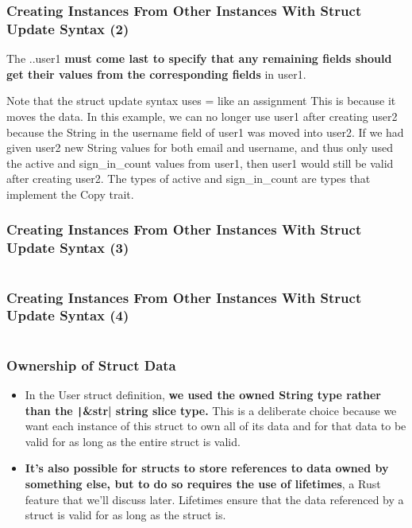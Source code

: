 \documentclass{beamer}
\begin{document}
\begin{frame}[fragile]
	\frametitle{Creating Instances From Other Instances With Struct Update Syntax (2)}
	The ..user1 \textbf{must come last to specify that any remaining fields should get their values from the corresponding fields} in user1.
	
	\begin{block}{Note that the struct update syntax uses = like an assignment}
		This is because it moves the data. In this example, we can no longer use user1 after creating user2 because the String in the username field of user1 was moved into user2. If we had given user2 new String values for both email and username, and thus only used the active and sign\_in\_count values from user1, then user1 would still be valid after creating user2. The types of active and sign\_in\_count are types that implement the Copy trait.
	\end{block}
	
\end{frame}


\begin{frame}[fragile]
	\frametitle{Creating Instances From Other Instances With Struct Update Syntax (3)}
	\inputminted{rust}{./code/struct-err.rs}
\end{frame}


\begin{frame}[fragile]
	\frametitle{Creating Instances From Other Instances With Struct Update Syntax (4)}
	\inputminted{shell}{./code/struct-err2.shell}
\end{frame}

\begin{frame}[fragile]
	\frametitle{Ownership of Struct Data}
	\begin{itemize}
		\item In the User struct definition,\textbf{ we used the owned String type rather than the \texttt|&str| string slice type.} This is a deliberate choice because we want each instance of this struct to own all of its data and for that data to be valid for as long as the entire struct is valid.
		\item 	\textbf{It’s also possible for structs to store references to data owned by something else, but to do so requires the use of lifetimes}, a Rust feature that we’ll discuss later. Lifetimes ensure that the data referenced by a struct is valid for as long as the struct is.
	\end{itemize}
\end{frame}
\end{document}
